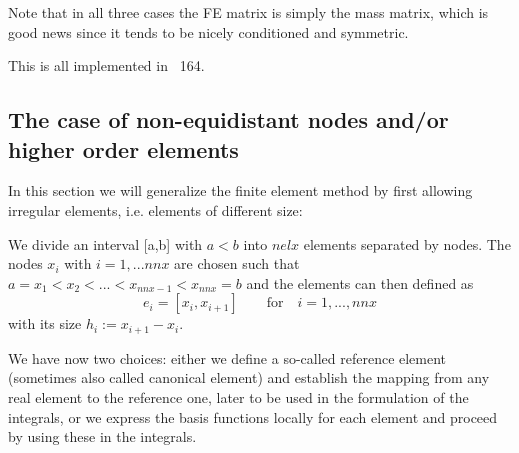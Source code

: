 Note that in all three cases the FE matrix is simply the mass matrix, 
which is good news since it tends to be nicely conditioned and symmetric.

This is all implemented in \stone~164. 

\subsection{The case of non-equidistant nodes and/or higher order elements}

In this section we will generalize the finite element method by first allowing irregular elements, i.e. 
elements of different size:
\begin{center}
\end{center}

We divide an interval [a,b] with $a<b$ into $nelx$ elements separated by nodes. 
The nodes $x_i$ with $i=1,...nnx$ are chosen such that $a=x_1<x_2<...<x_{nnx-1} < x_{nnx}=b$
and the elements can then defined as
\[
e_i = [x_i,x_{i+1}] \qquad \text{for} \quad i=1,...,nnx
\]
with its size $h_i:=x_{i+1}-x_i$.

We have now two choices: either we define a so-called reference element (sometimes also called
canonical element) and establish the mapping from any real element to the reference one, later to be used in the 
formulation of the integrals, or we express the basis functions locally for each element and proceed by using these 
in the integrals.

